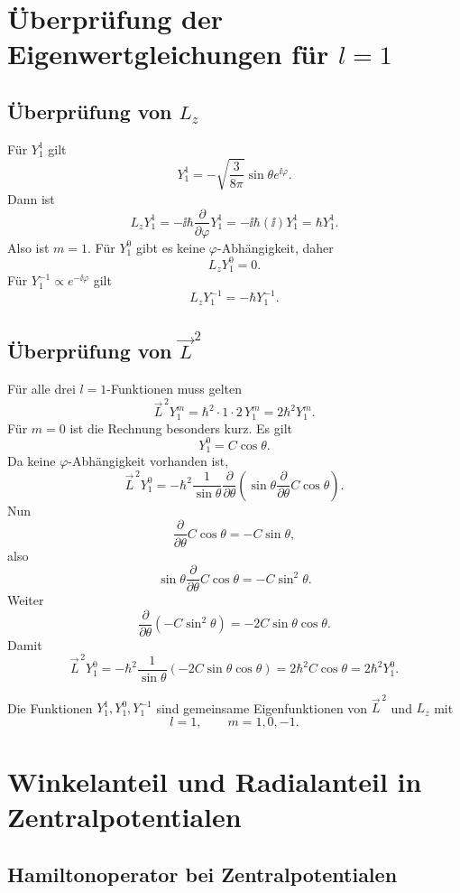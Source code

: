 \section{Überprüfung der Eigenwertgleichungen für \(l=1\)}

\subsection{Überprüfung von \(L_z\)}

Für \(Y_1^1\) gilt
\[
    Y_1^1=-\sqrt{\frac{3}{8\pi}}\sin\theta e^{\ii\varphi}.
\]
Dann ist
\[
    L_zY_1^1
    =-\ii\hbar\frac{\partial}{\partial\varphi}Y_1^1
    =-\ii\hbar(\ii)Y_1^1
    =\hbar Y_1^1.
\]
Also ist \(m=1\). Für \(Y_1^0\) gibt es keine \(\varphi\)-Abhängigkeit, daher
\[
    L_zY_1^0=0.
\]
Für \(Y_1^{-1}\propto e^{-\ii\varphi}\) gilt
\[
    L_zY_1^{-1}=-\hbar Y_1^{-1}.
\]

\subsection{Überprüfung von \(\vec L^{\,2}\)}

Für alle drei \(l=1\)-Funktionen muss gelten
\[
    \vec L^{\,2}Y_1^m=\hbar^2\cdot 1\cdot 2\,Y_1^m=2\hbar^2Y_1^m.
\]
Für \(m=0\) ist die Rechnung besonders kurz. Es gilt
\[
    Y_1^0=C\cos\theta.
\]
Da keine \(\varphi\)-Abhängigkeit vorhanden ist,
\[
    \vec L^{\,2}Y_1^0
    =-\hbar^2\frac{1}{\sin\theta}\frac{\partial}{\partial\theta}
    \left(\sin\theta\frac{\partial}{\partial\theta}C\cos\theta\right).
\]
Nun
\[
    \frac{\partial}{\partial\theta}C\cos\theta=-C\sin\theta,
\]
also
\[
    \sin\theta\frac{\partial}{\partial\theta}C\cos\theta=-C\sin^2\theta.
\]
Weiter
\[
    \frac{\partial}{\partial\theta}(-C\sin^2\theta)=-2C\sin\theta\cos\theta.
\]
Damit
\[
    \vec L^{\,2}Y_1^0
    =-\hbar^2\frac{1}{\sin\theta}(-2C\sin\theta\cos\theta)
    =2\hbar^2C\cos\theta
    =2\hbar^2Y_1^0.
\]

\begin{answerbox}
Die Funktionen \(Y_1^1,Y_1^0,Y_1^{-1}\) sind gemeinsame Eigenfunktionen von \(\vec L^{\,2}\) und \(L_z\) mit
\[
    l=1,
    \qquad
    m=1,0,-1.
\]
\end{answerbox}

\section{Winkelanteil und Radialanteil in Zentralpotentialen}

\subsection{Hamiltonoperator bei Zentralpotentialen}

